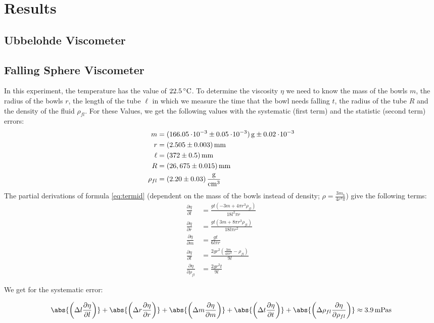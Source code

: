 \section{Results}

\subsection{Ubbelohde Viscometer}


\subsection{Falling Sphere Viscometer}
In this experiment, the temperature has the value of $22.5\C$. To determine the viscosity $\eta$ we need to know the mass of the bowls $m$, the radius of the bowls $r$, the length of the tube $\ell$ in which we measure the time that the bowl needs falling $t$, the radius of the tube $R$ and the density of the fluid $\rho_{fl}$. For these Values, we get the following values with the systematic (first term) and the statistic (second term) errors:
\begin{align*}
m &= \unit[(166.05\e{-3} \pm 0.05\e{-3})]{g} \pm 0.02 \e{-3}\\
r &= \unit[(2.505 \pm 0.003)]{mm}\\
\ell &= \unit[(372 \pm 0.5)]{mm}\\
R &= \unit[(26,675 \pm 0.015)]{mm}\\
\rho_{fl} &= \unit[(2.20 \pm 0.03)]{\frac{g}{cm^3}}
\end{align*}
The partial derivations of formula \ref{eq:termid} (dependent on the mass of the bowls instead of density; $\rho = \frac{3m_b}{4r^3\pi}$) give the following terms:
\begin{align*}
\frac{\partial \eta}{\partial l}  &= \frac{g t \left(-3 m+4 \pi  r^3 \rho_{fl}\right)}{18 l^2 \pi  r}\\
\frac{\partial \eta}{\partial r} &= \frac{g t \left(3 m+8 \pi  r^3 \rho_{fl}\right)}{18 l \pi  r^2}\\
\frac{\partial \eta}{\partial m} &= \frac{g t}{6 l \pi  r}\\
\frac{\partial \eta}{\partial t} &= \frac{2 g r^2 \left(\frac{3 m}{4 \pi  r^3}- \rho_{fl}\right)}{9 l}\\
\frac{\partial \eta}{\partial \rho_{fl}} &= \frac{2 g r^2 t}{9 l}
\end{align*}

We get for the systematic error:

\begin{equation}
\abs{\left(\Delta l\frac{\partial \eta}{\partial l}\right)}
+
\abs{\left(\Delta r\frac{\partial \eta}{\partial r}\right)}
+
\abs{\left(\Delta m\frac{\partial \eta}{\partial m}\right)}
+
\abs{\left(\Delta t\frac{\partial \eta}{\partial t}\right)}
+
\abs{\left(\Delta \rho_{fl}\frac{\partial \eta}{\partial \rho_{fl}}\right)}
\approx \unit[3.9]{mPa s}
\end{equation}

